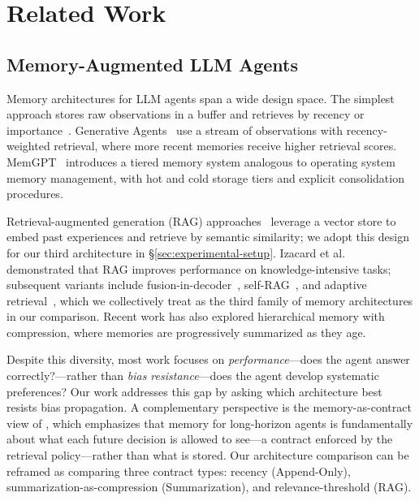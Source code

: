 \documentclass[11pt]{article}
\begin{document}
\section{Related Work}
\subsection{Memory-Augmented LLM Agents}

Memory architectures for LLM agents span a wide design space. The simplest approach stores raw observations in a buffer and retrieves by recency or importance~\cite{park2023generative}. Generative Agents~\cite{park2023generative} use a stream of observations with recency-weighted retrieval, where more recent memories receive higher retrieval scores. MemGPT~\cite{packer2023memgpt} introduces a tiered memory system analogous to operating system memory management, with hot and cold storage tiers and explicit consolidation procedures.

Retrieval-augmented generation (RAG) approaches~\cite{lewis2020rag} leverage a vector store to embed past experiences and retrieve by semantic similarity; we adopt this design for our third architecture in \S\ref{sec:experimental-setup}. Izacard et al.~\cite{izacard2022fusion} demonstrated that RAG improves performance on knowledge-intensive tasks; subsequent variants include fusion-in-decoder~\cite{izacard2022fusion}, self-RAG~\cite{asai2023selfrag}, and adaptive retrieval~\cite{jiang2023active}, which we collectively treat as the third family of memory architectures in our comparison. Recent work has also explored hierarchical memory with compression, where memories are progressively summarized as they age.

Despite this diversity, most work focuses on \emph{performance}---does the agent answer correctly?---rather than \emph{bias resistance}---does the agent develop systematic preferences? Our work addresses this gap by asking which architecture best resists bias propagation. A complementary perspective is the memory-as-contract view of \citet{cheng2026agenticsts}, which emphasizes that memory for long-horizon agents is fundamentally about what each future decision is allowed to see---a contract enforced by the retrieval policy---rather than what is stored. Our architecture comparison can be reframed as comparing three contract types: recency (Append-Only), summarization-as-compression (Summarization), and relevance-threshold (RAG).
\end{document}
